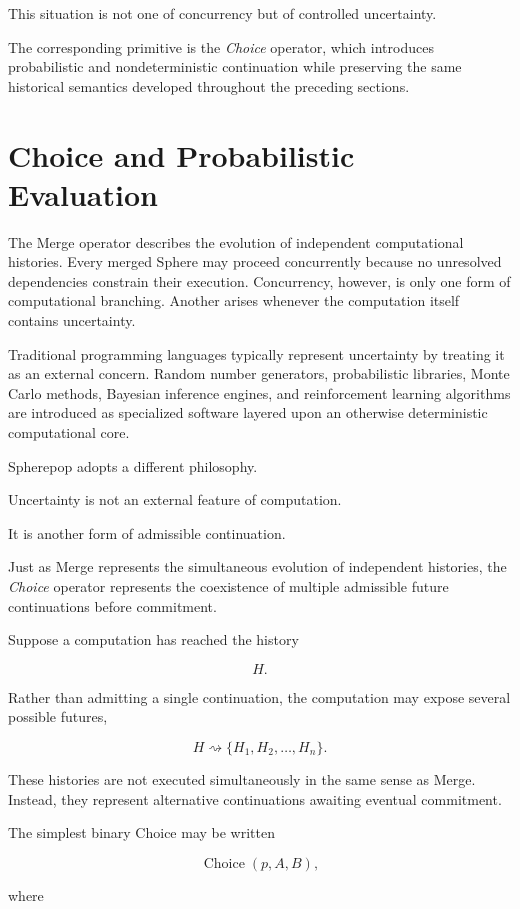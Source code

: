 \documentclass[12pt,oneside]{article}
\theoremstyle{definition}
\theoremstyle{remark}
\begin{document}
This situation is not one of concurrency but of controlled uncertainty.

The corresponding primitive is the \emph{Choice} operator, which introduces
probabilistic and nondeterministic continuation while preserving the same
historical semantics developed throughout the preceding sections.

\section{Choice and Probabilistic Evaluation}

The Merge operator describes the evolution of independent computational
histories. Every merged Sphere may proceed concurrently because no unresolved
dependencies constrain their execution. Concurrency, however, is only one form
of computational branching. Another arises whenever the computation itself
contains uncertainty.

Traditional programming languages typically represent uncertainty by treating
it as an external concern. Random number generators, probabilistic libraries,
Monte Carlo methods, Bayesian inference engines, and reinforcement learning
algorithms are introduced as specialized software layered upon an otherwise
deterministic computational core.

Spherepop adopts a different philosophy.

Uncertainty is not an external feature of computation.

It is another form of admissible continuation.

Just as Merge represents the simultaneous evolution of independent histories,
the \emph{Choice} operator represents the coexistence of multiple admissible
future continuations before commitment.

Suppose a computation has reached the history

\[
H.
\]

Rather than admitting a single continuation, the computation may expose
several possible futures,

\[
H
\rightsquigarrow
\{H_1,H_2,\ldots,H_n\}.
\]

These histories are not executed simultaneously in the same sense as Merge.
Instead, they represent alternative continuations awaiting eventual
commitment.

The simplest binary Choice may be written

\[
\operatorname{Choice}(p,A,B),
\]

where
\end{document}
